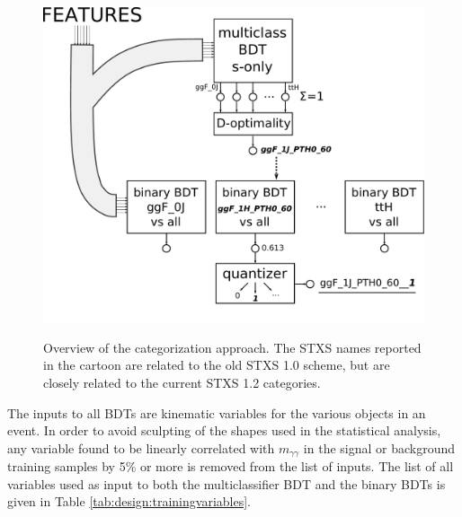 \begin{figure}[tbp]
  \centering
  \includegraphics[width=0.7\linewidth]{figures/couplings_chapter/sketch_Dopt.pdf}
  \label{fig:global_cat_sketch}
  \caption{Overview of the categorization approach. The STXS names reported in the cartoon are related to the old STXS 1.0 scheme, but are closely related to the current STXS 1.2 categories.}
\end{figure}

The inputs to all BDTs are kinematic variables for the various objects in an event. In order to avoid sculpting of the shapes used in the statistical analysis, any variable found to be linearly correlated with $m_{\gamma \gamma}$ in the signal or background training samples by 5\% or more is removed from the list of inputs. The list of all variables used as input to both the multiclassifier BDT and the binary BDTs is given in Table \ref{tab:design:trainingvariables}.


